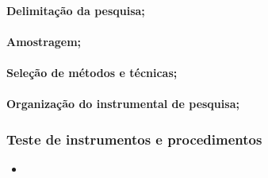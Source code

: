 \documentclass[
]{book}
\providecommand{\tightlist}{%
  \setlength{\itemsep}{0pt}\setlength{\parskip}{0pt}}
\begin{document}
\hypertarget{delimitauxe7uxe3o-da-pesquisa}{%
\paragraph{Delimitação da pesquisa;}\label{delimitauxe7uxe3o-da-pesquisa}}

\hypertarget{amostragem}{%
\paragraph{Amostragem;}\label{amostragem}}

\hypertarget{seleuxe7uxe3o-de-muxe9todos-e-tuxe9cnicas}{%
\paragraph{Seleção de métodos e técnicas;}\label{seleuxe7uxe3o-de-muxe9todos-e-tuxe9cnicas}}

\hypertarget{organizauxe7uxe3o-do-instrumental-de-pesquisa}{%
\paragraph{Organização do instrumental de pesquisa;}\label{organizauxe7uxe3o-do-instrumental-de-pesquisa}}

\hypertarget{teste-de-instrumentos-e-procedimentos}{%
\subsubsection{Teste de instrumentos e procedimentos}\label{teste-de-instrumentos-e-procedimentos}}

\begin{itemize}
\tightlist
\item
\end{itemize}

  
\end{document}
